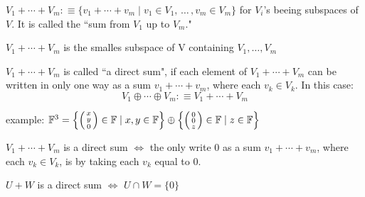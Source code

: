 \setcounter{thm}{35}

\begin{mydef}
    $V_1 + \cdots + V_m :\equiv \{v_1 + \cdots + v_m \mid v_1 \in V_1, \, \dots \, , v_m \in V_m \}$ for $V_i$'s beeing subspaces of $V$. It is called the ``sum from $V_1$ up to $V_m$."
\end{mydef} 

\setcounter{thm}{39}
\begin{thm}
    $V_1 + \cdots + V_m$ is the smalles subspace of V containing $V_1, \dots, V_m$
\end{thm}

\setcounter{thm}{40}
\begin{thm}
    $V_1 + \cdots + V_m$ is called ``a direct sum", if each element of $V_1 +\cdots+V_m$ can be written in only one way as a sum $v_1 + \cdots + v_m$, where each $v_k \in V_k$. In this case: 
    \begin{equation}
    	V_1 \oplus \cdots \oplus V_m :\equiv V_1 + \cdots + V_m
    \end{equation}
\end{thm}

\begin{example}
   example: ${\mathbb{F}}^3 = 
   \left \{ \left ( \begin{smallmatrix} x \\ y \\ 0 \end{smallmatrix} \right ) \in {\mathbb{F}} \mid x,y \in {\mathbb{F}} \right \} 
   \oplus 
   \left \{ \left ( \begin{smallmatrix} 0 \\ 0 \\ z \end{smallmatrix} \right ) \in {\mathbb{F}} \mid z \in {\mathbb{F}} \right \}$ 
\end{example}


\setcounter{thm}{44}
\begin{thm}
    $V_1 + \cdots + V_m$ is a direct sum $\iff$ the only write $0$ as a sum $v_1 + \cdots + v_m$, where each $v_k \in V_k$, is by taking each $v_k$ equal to $0$.
\end{thm}


\setcounter{thm}{45}
\begin{thm}
    $U+W$ is a direct sum $\iff$ $U \cap W = \{0\}$
\end{thm}
